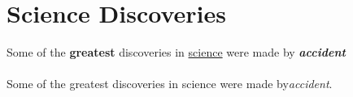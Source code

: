 \documentclass{article}
\begin{document}
	
	\section{Science Discoveries}
	Some of the \textbf{greatest}
	discoveries in \underline{science}
	were made by
	\textbf{\textit{accident}}
	
	\paragraph{}
	Some of the greatest discoveries in science were made by\emph{accident}.
	
\end{document}
